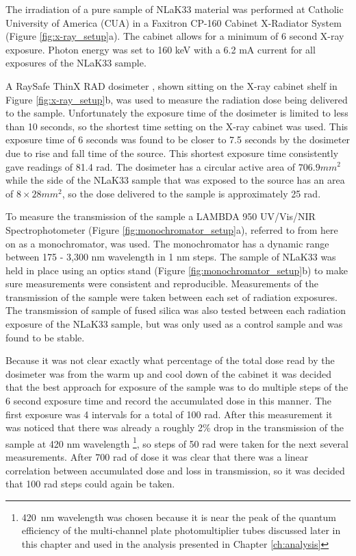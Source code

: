 The irradiation of a pure sample of NLaK33 material was performed at Catholic University of America (CUA) in a Faxitron CP-160 Cabinet X-Radiator System \cite{XRayCabinet} (Figure \ref{fig:x-ray_setup}a). The cabinet allows for a minimum of 6 second X-ray exposure. Photon energy was set to 160 keV with a 6.2 mA current for all exposures of the NLaK33 sample.

A RaySafe ThinX RAD dosimeter \cite{Dosimeter}, shown sitting on the X-ray cabinet shelf in Figure \ref{fig:x-ray_setup}b, was used to measure the radiation dose being delivered to the sample. Unfortunately the exposure time of the dosimeter is limited to less than 10 seconds, so the shortest time setting on the X-ray cabinet was used. This exposure time of 6 seconds was found to be closer to 7.5 seconds by the dosimeter due to rise and fall time of the source. This shortest exposure time consistently gave readings of 81.4 rad. The dosimeter has a circular active area of $706.9\unit{mm}^2$ while the side of the NLaK33 sample that was exposed to the source has an area of $8\times28\unit{mm}^2$, so the dose delivered to the sample is approximately 25 rad.

To measure the transmission of the sample a LAMBDA 950 UV/Vis/NIR Spectrophotometer \cite{Monochromator} (Figure \ref{fig:monochromator_setup}a), referred to from here on as a monochromator, was used. The monochromator has a dynamic range between 175 - 3,300 nm wavelength in 1 nm steps. The sample of NLaK33 was held in place using an optics stand (Figure \ref{fig:monochromator_setup}b) to make sure measurements were consistent and reproducible. Measurements of the transmission of the sample were taken between each set of radiation exposures. The transmission of sample of fused silica was also tested between each radiation exposure of the NLaK33 sample, but was only used as a control sample and was found to be stable.

Because it was not clear exactly what percentage of the total dose read by the dosimeter was from the warm up and cool down of the cabinet it was decided that the best approach for exposure of the sample was to do multiple steps of the 6 second exposure time and record the accumulated dose in this manner. The first exposure was 4 intervals for a total of 100 rad. After this measurement it was noticed that there was already a roughly 2\% drop in the transmission of the sample at 420 nm wavelength \footnote{420~nm wavelength was chosen because it is near the peak of the quantum efficiency of the multi-channel plate photomultiplier tubes discussed later in this chapter and used in the analysis presented in Chapter \ref{ch:analysis}}, so steps of 50 rad were taken for the next several measurements. After 700 rad of dose it was clear that there was a linear correlation between accumulated dose and loss in transmission, so it was decided that 100 rad steps could again be taken. 

